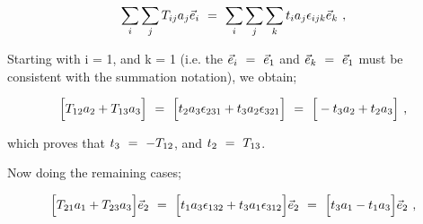 \documentclass{article}
\begin{document}
\begin{equation} \label{eq:1}
\sum_{i} \sum_{j} T_{i j} a_j \vec{e}_i \hspace{0.125cm} = \hspace{0.125cm} \sum_{i} \sum_{j}\sum_{k} t_i a_j \epsilon_{i j k} \vec{e}_k \hspace{0.125cm} , 
\end{equation}

Starting with  i = 1, and k = 1 (i.e. the \begin{math} \vec{e}_i \hspace{0.125cm} = \hspace{0.125cm} \vec{e}_1 \end{math} and \begin{math} \vec{e}_k \hspace{0.125cm} = \hspace{0.125cm} \vec{e}_1 \end{math} must be consistent with the summation notation), we obtain;

\begin{equation} \label{eq:1}
\Big[ T_{1 2} a_2 + T_{1 3} a_3 \Big] \hspace{0.125cm} = \hspace{0.125cm} \Big[ t_2 a_3 \epsilon_{2 3 1} + t_3 a_2 \epsilon_{3 2 1} \Big]\hspace{0.125cm} = \hspace{0.125cm} \Big[- t_3 a_2 + t_2 a_3 \Big] \hspace{0.125cm} , 
\end{equation}

which proves that \begin{math}  t_3 \hspace{0.125cm} = \hspace{0.125cm} - T_{1 2} \end{math}, and \begin{math} t_2 \hspace{0.125cm} = \hspace{0.125cm} T_{1 3} \end{math}.

Now doing the remaining cases; 

\begin{equation} \label{eq:1}
\Big[ T_{2 1} a_1 + T_{2 3} a_3 \Big] \vec{e}_2 \hspace{0.125cm} = \hspace{0.125cm} \Big[ t_1 a_3 \epsilon_{1 3 2} + t_3 a_1 \epsilon_{3 1 2} \Big] \vec{e}_2 \hspace{0.125cm} = \hspace{0.125cm} \Big[ t_3 a_1 - t_1 a_3 \Big] \vec{e}_2 \hspace{0.125cm} , 
\end{equation}
\end{document}
